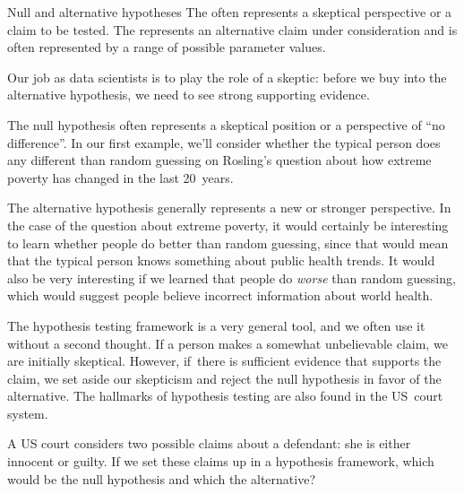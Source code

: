 \begin{onebox}{Null and alternative hypotheses}
  The  often represents
  a skeptical perspective or a claim to be tested.
  The  represents an
  alternative claim under consideration and is often
  represented by a range of possible parameter values.
  \vspace{3mm}
  
  Our job as data scientists is to play the role of a skeptic:
  before we buy into the alternative hypothesis, we need to
  see strong supporting evidence.
\end{onebox}

The null hypothesis often represents a skeptical position
or a perspective of ``no difference''.
In our first example, we'll consider whether
the typical person does any different than random guessing
on Rosling's question about how extreme poverty has changed
in the last 20~years.

The alternative hypothesis generally represents a new
or stronger perspective. In the case of the question
about extreme poverty,
it would certainly be interesting to learn whether
people do better than random guessing, since that would
mean that the typical person knows something about
public health trends.
It would also be very interesting if we learned
that people do \emph{worse} than random guessing,
which would suggest people believe
incorrect information about world health.

The hypothesis testing framework is a very general tool, and we often use it without a second thought. If a person makes a somewhat unbelievable claim, we are initially skeptical. However, if~there is sufficient evidence that supports the claim, we set aside our skepticism and reject the null hypothesis in favor of the alternative. The hallmarks of hypothesis testing are also found in the US~court system. 

\begin{exercisewrap}
\begin{nexercise} \label{hypTestCourtExample}
A US court considers two possible claims about a defendant: she is either innocent or guilty. If we set these claims up in a hypothesis framework, which would be the null hypothesis and which the alternative?\footnotemark
\end{nexercise}
\end{exercisewrap}

